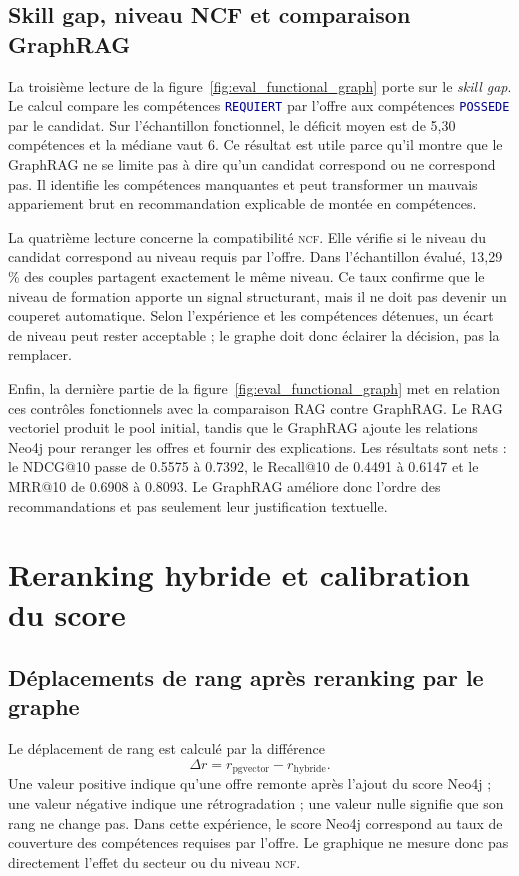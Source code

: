\documentclass[12pt,twoside]{report}
\newcommand{\filevar}[1]{\texttt{\textcolor{darkblue}{#1}}}
\newcommand{\NCF}{\textsc{ncf}}
\begin{document}
\subsection{Skill gap, niveau NCF et comparaison GraphRAG}

La troisième lecture de la figure~\ref{fig:eval_functional_graph} porte sur le \textit{skill gap}. Le calcul compare les compétences \filevar{REQUIERT} par l'offre aux compétences \filevar{POSSEDE} par le candidat. Sur l'échantillon fonctionnel, le déficit moyen est de 5,30 compétences et la médiane vaut 6. Ce résultat est utile parce qu'il montre que le GraphRAG ne se limite pas à dire qu'un candidat correspond ou ne correspond pas. Il identifie les compétences manquantes et peut transformer un mauvais appariement brut en recommandation explicable de montée en compétences.

La quatrième lecture concerne la compatibilité \NCF{}. Elle vérifie si le niveau du candidat correspond au niveau requis par l'offre. Dans l'échantillon évalué, 13,29\,\% des couples partagent exactement le même niveau. Ce taux confirme que le niveau de formation apporte un signal structurant, mais il ne doit pas devenir un couperet automatique. Selon l'expérience et les compétences détenues, un écart de niveau peut rester acceptable ; le graphe doit donc éclairer la décision, pas la remplacer.

Enfin, la dernière partie de la figure~\ref{fig:eval_functional_graph} met en relation ces contrôles fonctionnels avec la comparaison RAG contre GraphRAG. Le RAG vectoriel produit le pool initial, tandis que le GraphRAG ajoute les relations Neo4j pour reranger les offres et fournir des explications. Les résultats sont nets : le NDCG@10 passe de 0.5575 à 0.7392, le Recall@10 de 0.4491 à 0.6147 et le MRR@10 de 0.6908 à 0.8093. Le GraphRAG améliore donc l'ordre des recommandations et pas seulement leur justification textuelle.

\section{Reranking hybride et calibration du score}

\subsection{Déplacements de rang après reranking par le graphe}

Le déplacement de rang est calculé par la différence
\[
\Delta r = r_{\text{pgvector}}-r_{\text{hybride}}.
\]
Une valeur positive indique qu'une offre remonte après l'ajout du score Neo4j ; une valeur négative indique une rétrogradation ; une valeur nulle signifie que son rang ne change pas. Dans cette expérience, le score Neo4j correspond au taux de couverture des compétences requises par l'offre. Le graphique ne mesure donc pas directement l'effet du secteur ou du niveau \NCF{}.
\end{document}
